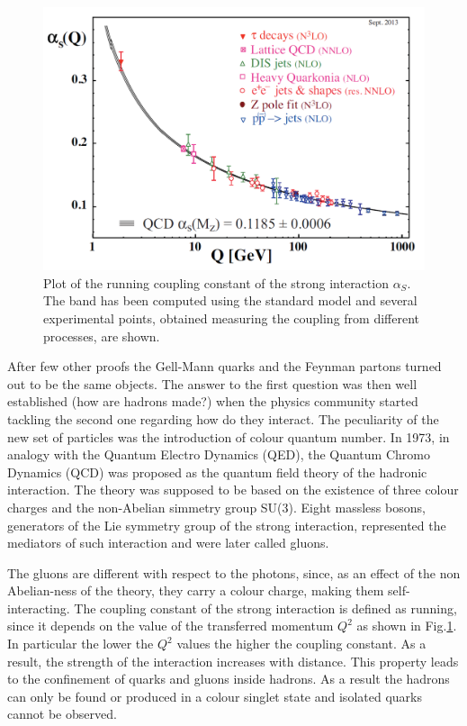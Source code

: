 \begin{figure}[!t]
\begin{center}
\includegraphics[width=0.85\linewidth]{Chapters/Introduction/Figs/QCD-running-coupling.pdf}
\caption{Plot of the running coupling constant of the strong interaction $\alpha_S$. The band has been computed using the standard model and several experimental points, obtained measuring the coupling from different processes, are shown.}
\label{fig:running}
\end{center}
\end{figure}

After few other proofs the Gell-Mann quarks and the Feynman partons turned out to be the same objects.
The answer to the first question was then well established (how are hadrons made?) when the physics community started tackling the second one regarding how do they interact.
The peculiarity of the new set of particles was the introduction of colour quantum number.
In 1973, in analogy with the Quantum Electro Dynamics (QED), the Quantum Chromo Dynamics (QCD) was proposed as the quantum field theory of the hadronic interaction.
The theory was supposed to be based on the existence of three colour charges and the non-Abelian simmetry group SU(3).
Eight massless bosons, generators of the Lie symmetry group of the strong interaction, represented the mediators of such interaction and were later called gluons.

The gluons are different with respect to the photons, since, as an effect of the non Abelian-ness of the theory, they carry a colour charge, making them self-interacting.
The coupling constant of the strong interaction is defined as running, since it depends on the value of the transferred momentum $Q^2$ as shown in Fig.\ref{fig:running}.
In particular the lower the $Q^2$ values the higher the coupling constant.
As a result, the strength of the interaction increases with distance.
This property leads to the confinement of quarks and gluons inside hadrons.
As a result the hadrons can only be found or produced in a colour singlet state and isolated quarks cannot be observed.

